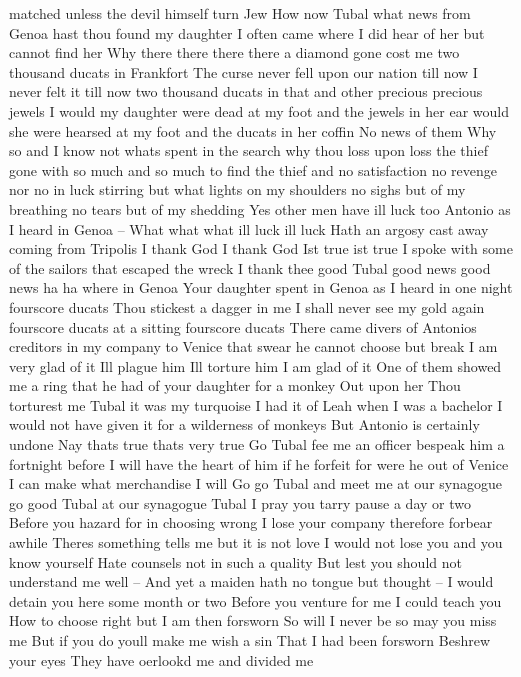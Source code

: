 matched unless the devil himself turn Jew
How now Tubal what news from Genoa hast thou
found my daughter
I often came where I did hear of her but cannot find her
Why there there there there a diamond gone
cost me two thousand ducats in Frankfort The curse
never fell upon our nation till now I never felt it
till now two thousand ducats in that and other
precious precious jewels I would my daughter
were dead at my foot and the jewels in her ear
would she were hearsed at my foot and the ducats in
her coffin No news of them Why so and I know
not whats spent in the search why thou loss upon
loss the thief gone with so much and so much to
find the thief and no satisfaction no revenge
nor no in luck stirring but what lights on my
shoulders no sighs but of my breathing no tears
but of my shedding
Yes other men have ill luck too Antonio as I
heard in Genoa --
What what what ill luck ill luck
Hath an argosy cast away coming from Tripolis
I thank God I thank God Ist true ist true
I spoke with some of the sailors that escaped the wreck
I thank thee good Tubal good news good news
ha ha where in Genoa
Your daughter spent in Genoa as I heard in one
night fourscore ducats
Thou stickest a dagger in me I shall never see my
gold again fourscore ducats at a sitting
fourscore ducats
There came divers of Antonios creditors in my
company to Venice that swear he cannot choose but break
I am very glad of it Ill plague him Ill torture
him I am glad of it
One of them showed me a ring that he had of your
daughter for a monkey
Out upon her Thou torturest me Tubal it was my
turquoise I had it of Leah when I was a bachelor
I would not have given it for a wilderness of monkeys
But Antonio is certainly undone
Nay thats true thats very true Go Tubal fee
me an officer bespeak him a fortnight before I
will have the heart of him if he forfeit for were
he out of Venice I can make what merchandise I
will Go go Tubal and meet me at our synagogue
go good Tubal at our synagogue Tubal
I pray you tarry pause a day or two
Before you hazard for in choosing wrong
I lose your company therefore forbear awhile
Theres something tells me but it is not love
I would not lose you and you know yourself
Hate counsels not in such a quality
But lest you should not understand me well --
And yet a maiden hath no tongue but thought --
I would detain you here some month or two
Before you venture for me I could teach you
How to choose right but I am then forsworn
So will I never be so may you miss me
But if you do youll make me wish a sin
That I had been forsworn Beshrew your eyes
They have oerlookd me and divided me
